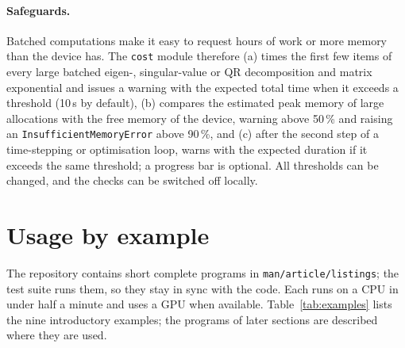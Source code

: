 \documentclass[11pt]{article}
\begin{document}
\paragraph{Safeguards.} Batched computations make it easy to request hours of work or more memory than
the device has. The \texttt{cost} module therefore (a) times the first few items of every large
batched eigen-, singular-value or QR decomposition and matrix exponential and issues a warning with the expected
total time when it exceeds a threshold (10\,s by default), (b) compares the estimated peak memory of
large allocations with the free memory of the device, warning above 50\,\% and raising an
\texttt{InsufficientMemoryError} above 90\,\%, and (c) after the second step of a time-stepping
or optimisation loop, warns with the expected duration if it exceeds the same threshold; a progress bar is optional. All thresholds can
be changed, and the checks can be switched off locally.

\section{Usage by example}\label{sec:usage}

The repository contains short complete programs in \texttt{man/article/listings}; the test suite runs them, so they
stay in sync with the code. Each runs on a CPU in under half a minute and uses a GPU when available.
Table~\ref{tab:examples} lists the nine introductory examples; the programs of later sections are described where
they are used.
\end{document}
